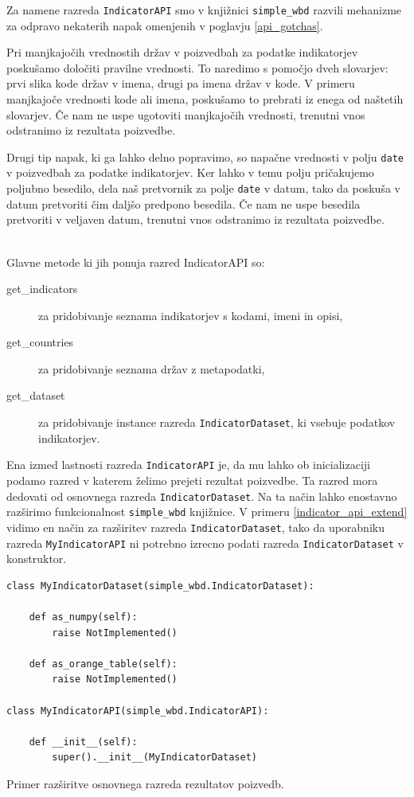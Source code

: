 Za namene razreda \verb|IndicatorAPI| smo v knjižnici \verb|simple_wbd|
razvili mehanizme za odpravo nekaterih napak omenjenih v poglavju 
\ref{api_gotchas}.

Pri manjkajočih vrednostih držav v poizvedbah za podatke indikatorjev
poskušamo določiti pravilne vrednosti. To naredimo s pomočjo dveh
slovarjev: prvi slika kode držav v imena, drugi pa imena držav v kode. V
primeru manjkajoče vrednosti kode ali imena, poskušamo to prebrati iz enega
od naštetih slovarjev. Če nam ne uspe ugotoviti manjkajočih vrednosti,
trenutni vnos odstranimo iz rezultata poizvedbe.

Drugi tip napak, ki ga lahko delno popravimo, so napačne vrednosti v polju
\verb|date| v poizvedbah za podatke indikatorjev. Ker lahko v temu polju
pričakujemo poljubno besedilo, dela naš pretvornik za polje \verb|date| v 
datum, tako da poskuša v datum pretvoriti čim daljšo predpono besedila.
Če nam ne uspe besedila pretvoriti v veljaven datum, trenutni vnos odstranimo
iz rezultata poizvedbe.


\ \\
Glavne metode ki jih ponuja razred IndicatorAPI so:

\begin{description}  
\item [get\_indicators] za pridobivanje seznama indikatorjev s kodami, imeni
      in opisi,
\item [get\_countries] za pridobivanje seznama držav z metapodatki,
\item [get\_dataset] za pridobivanje instance razreda \verb|IndicatorDataset|,
      ki vsebuje podatkov indikatorjev.
\end{description}

Ena izmed lastnosti razreda \verb|IndicatorAPI| je, da mu lahko ob
inicializaciji podamo razred v katerem želimo prejeti rezultat poizvedbe. Ta
razred mora dedovati od osnovnega razreda \verb|IndicatorDataset|. Na ta
način lahko enostavno razširimo funkcionalnost \verb|simple_wbd| knjižnice.
V primeru \ref{indicator_api_extend} vidimo en način za razširitev razreda 
\verb|IndicatorDataset|, tako da uporabniku razreda \verb|MyIndicatorAPI| ni
potrebno izrecno podati razreda \verb|IndicatorDataset| v konstruktor.

\begin{snippet}
\begin{center}
\begin{lstlisting}
class MyIndicatorDataset(simple_wbd.IndicatorDataset):
    
    def as_numpy(self):
        raise NotImplemented()
    
    def as_orange_table(self):
        raise NotImplemented()

class MyIndicatorAPI(simple_wbd.IndicatorAPI):

    def __init__(self):
        super().__init__(MyIndicatorDataset)
\end{lstlisting}
\end{center}
\caption[some]{Primer razširitve osnovnega razreda rezultatov poizvedb.}
\label{indicator_api_extend}
\end{snippet} 


